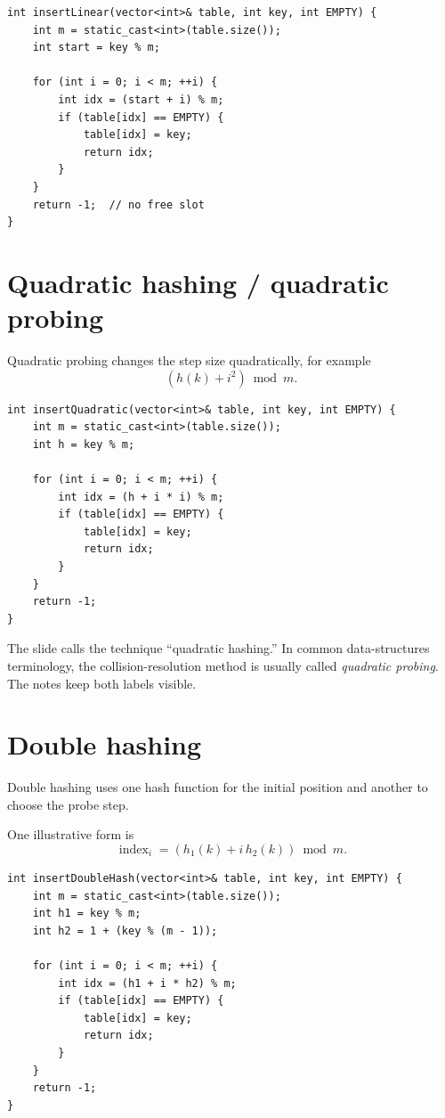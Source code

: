 \begin{lstlisting}
int insertLinear(vector<int>& table, int key, int EMPTY) {
    int m = static_cast<int>(table.size());
    int start = key % m;

    for (int i = 0; i < m; ++i) {
        int idx = (start + i) % m;
        if (table[idx] == EMPTY) {
            table[idx] = key;
            return idx;
        }
    }
    return -1;  // no free slot
}
\end{lstlisting}

\section{Quadratic hashing / quadratic probing}

Quadratic probing changes the step size quadratically, for example
\[
(h(k)+i^2)\bmod m.
\]

\begin{lstlisting}
int insertQuadratic(vector<int>& table, int key, int EMPTY) {
    int m = static_cast<int>(table.size());
    int h = key % m;

    for (int i = 0; i < m; ++i) {
        int idx = (h + i * i) % m;
        if (table[idx] == EMPTY) {
            table[idx] = key;
            return idx;
        }
    }
    return -1;
}
\end{lstlisting}

\begin{clarification}
The slide calls the technique ``quadratic hashing.'' In common data-structures terminology, the collision-resolution method is usually called \emph{quadratic probing}. The notes keep both labels visible.
\end{clarification}

\section{Double hashing}

Double hashing uses one hash function for the initial position and another to choose the probe step.

One illustrative form is
\[
\operatorname{index}_i=(h_1(k)+i\,h_2(k))\bmod m.
\]

\begin{lstlisting}
int insertDoubleHash(vector<int>& table, int key, int EMPTY) {
    int m = static_cast<int>(table.size());
    int h1 = key % m;
    int h2 = 1 + (key % (m - 1));

    for (int i = 0; i < m; ++i) {
        int idx = (h1 + i * h2) % m;
        if (table[idx] == EMPTY) {
            table[idx] = key;
            return idx;
        }
    }
    return -1;
}
\end{lstlisting}

